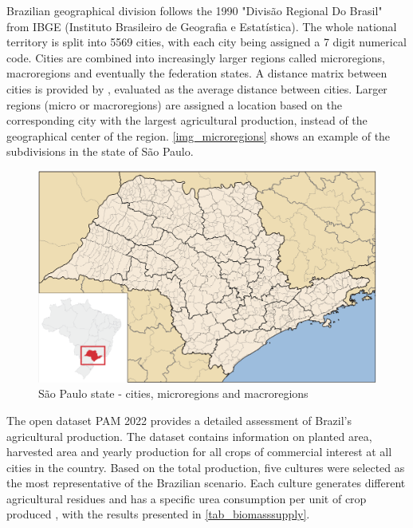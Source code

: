\documentclass[a4paper, titlepage]{article}
\begin{document}
Brazilian geographical division follows the 1990 "Divisão Regional Do Brasil" from IBGE (Instituto Brasileiro de
Geografia e Estatística). The whole national territory is split into 5569 cities, with each city being assigned a 7 digit
numerical code. Cities are combined into increasingly larger regions called 
microregions, macroregions and eventually the federation states. A distance matrix between cities is provided by
\textcite{carvalhoMatrizesDistanciasTempo2021}, evaluated as the average distance between cities. Larger regions
(micro or macroregions) are assigned a location based on the corresponding city with the largest agricultural production,
instead of the geographical center of the region. \autoref{img_microregions} shows an example of the subdivisions in
the state of São Paulo.

\begin{figure}
	\includegraphics[width=\textwidth]{img/saopaulo_microregions.png}
	\caption{São Paulo state - cities, microregions and macroregions}
	\label{img_microregions}
\end{figure}

The open dataset PAM 2022 \cite{IBGEPAMProducao2022} provides a detailed assessment of Brazil's agricultural production.
The dataset contains information on planted area, harvested area and yearly production for all crops of commercial
interest at all cities in the country. Based on the total production, five cultures were selected as the most
representative of the Brazilian scenario. Each culture generates different agricultural residues
 \cite{souzaTheoreticalTechnicalAssessment2021} and has a specific urea consumption per unit of crop produced 
 \cite{IFASTATFertilizerUse2024}, with the results presented in \autoref{tab_biomasssupply}. 
\end{document}
